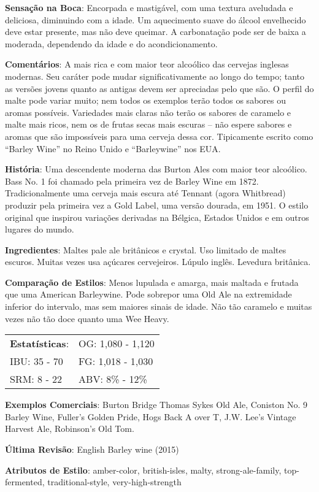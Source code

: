 \textbf{Sensação na Boca}: Encorpada e mastigável, com uma textura aveludada e deliciosa, diminuindo com a idade. Um aquecimento suave do álcool envelhecido deve estar presente, mas não deve queimar. A carbonatação pode ser de baixa a moderada, dependendo da idade e do acondicionamento.

\textbf{Comentários}: A mais rica e com maior teor alcoólico das cervejas inglesas modernas. Seu caráter pode mudar significativamente ao longo do tempo; tanto as versões jovens quanto as antigas devem ser apreciadas pelo que são. O perfil do malte pode variar muito; nem todos os exemplos terão todos os sabores ou aromas possíveis. Variedades mais claras não terão os sabores de caramelo e malte mais ricos, nem os de frutas secas mais escuras – não espere sabores e aromas que são impossíveis para uma cerveja dessa cor. Tipicamente escrito como “Barley Wine” no Reino Unido e “Barleywine” nos EUA.

\textbf{História}: Uma descendente moderna das Burton Ales com maior teor alcoólico. Bass No. 1 foi chamado pela primeira vez de Barley Wine em 1872. Tradicionalmente uma cerveja mais escura até Tennant (agora Whitbread) produzir pela primeira vez a Gold Label, uma versão dourada, em 1951. O estilo original que inspirou variações derivadas na Bélgica, Estados Unidos e em outros lugares do mundo.

\textbf{Ingredientes}: Maltes pale ale britânicos e crystal. Uso limitado de maltes escuros. Muitas vezes usa açúcares cervejeiros. Lúpulo inglês. Levedura britânica.

\textbf{Comparação de Estilos}: Menos lupulada e amarga, mais maltada e frutada que uma American Barleywine. Pode sobrepor uma Old Ale na extremidade inferior do intervalo, mas sem maiores sinais de idade. Não tão caramelo e muitas vezes não tão doce quanto uma Wee Heavy.

\begin{tabular}{@{}p{35mm}p{35mm}@{}}
  \textbf{Estatísticas}: & OG: 1,080 - 1,120 \\
  IBU: 35 - 70  & FG: 1,018 - 1,030  \\
  SRM: 8 - 22  & ABV: 8\% - 12\%
\end{tabular}

\textbf{Exemplos Comerciais}: Burton Bridge Thomas Sykes Old Ale, Coniston No. 9 Barley Wine, Fuller’s Golden Pride, Hogs Back A over T, J.W. Lee’s Vintage Harvest Ale, Robinson’s Old Tom.

\textbf{Última Revisão}: English Barley wine (2015)


\textbf{Atributos de Estilo}: amber-color, british-isles, malty, strong-ale-family, top-fermented, traditional-style, very-high-strength


